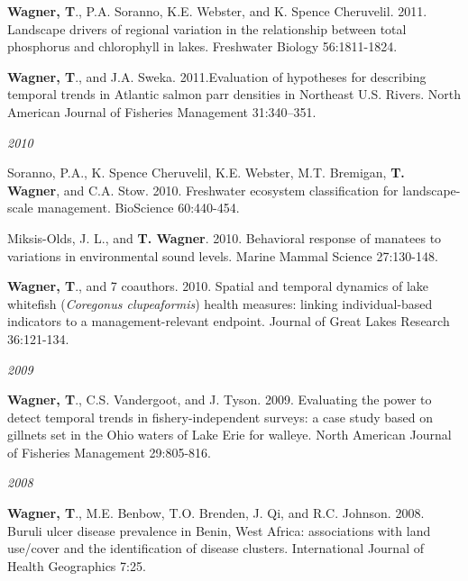 \documentclass[10pt]{article}
\begin{document}
\begin{flushleft}
\begin{etaremune}[start=22]
\item {\bf Wagner, T}., P.A. Soranno, K.E. Webster, and K. Spence Cheruvelil. 2011. Landscape drivers of regional variation in the relationship between total phosphorus and chlorophyll in lakes. Freshwater Biology 56:1811-1824.

\item {\bf Wagner, T}., and J.A. Sweka. 2011.Evaluation of hypotheses for describing temporal trends in Atlantic salmon parr densities in Northeast U.S. Rivers. North American Journal of Fisheries Management 31:340–351. 

\end{etaremune}
\emph{2010}
\begin{etaremune}[start=18]
\item Soranno, P.A., K. Spence Cheruvelil, K.E. Webster, M.T. Bremigan, {\bf T. Wagner}, and C.A. Stow. 2010. Freshwater ecosystem classification for landscape-scale management. BioScience 60:440-454.

\item Miksis-Olds, J. L., and {\bf T. Wagner}. 2010. Behavioral response of manatees to variations in environmental sound levels. Marine Mammal Science 27:130-148.

\item {\bf Wagner, T}., and 7 coauthors. 2010. Spatial and temporal dynamics of lake whitefish (\emph{Coregonus clupeaformis}) health measures: linking individual-based indicators to a management-relevant endpoint. Journal of Great Lakes Research 36:121-134.

\end{etaremune}
\emph{2009}
\begin{etaremune}[start=15]
\item {\bf Wagner, T}., C.S. Vandergoot, and J. Tyson. 2009. Evaluating the power to detect temporal trends in fishery-independent surveys: a case study based on gillnets set in the Ohio waters of Lake Erie for walleye. North American Journal of Fisheries Management 29:805-816.

\end{etaremune}
\emph{2008}
\begin{etaremune}[start=14]
\item {\bf Wagner, T}., M.E. Benbow, T.O. Brenden, J. Qi, and R.C. Johnson. 2008. Buruli ulcer disease prevalence in Benin, West Africa: associations with land use/cover and the identification of disease clusters. International Journal of Health Geographics 7:25.


\end{etaremune}
\end{flushleft}
\end{document}
